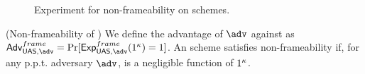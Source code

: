 \begin{figure}[htp!]
  \caption{Experiment for non-frameability on \UAS schemes.}
  \label{fig:exp-uas-frame}
\end{figure}

\begin{definition}{(Non-frameability of \UAS)}
  \label{def:frame-uas}
  We define the advantage \AdvNonframe of $\adv$ against \ExpNonframe as
  $\AdvNonframe=\Pr\lbrack\ExpNonframe(1^\secpar)=1\rbrack$.
  An \UAS scheme satisfies non-frameability if, for any p.p.t. adversary $\adv$,
  \AdvNonframe is a negligible function of $1^\kappa$.
\end{definition}

